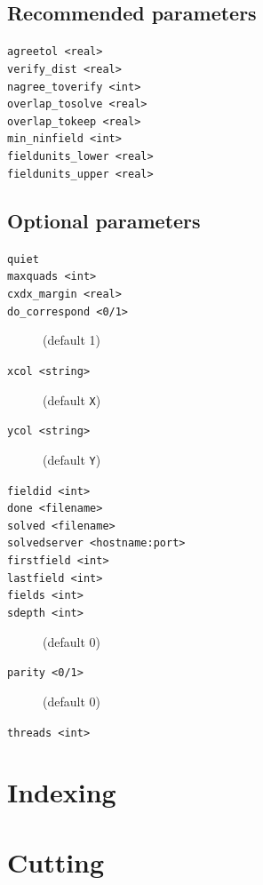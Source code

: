 \documentclass[12pt,letterpaper,titlepage]{article}
\newcommand{\code}[1]{\texttt{#1}}
\begin{document}
\subsection{Recommended parameters}
\begin{description}
\item[\code{agreetol <real>}]
\item[\code{verify\_dist <real>}]
\item[\code{nagree\_toverify <int>}]
\item[\code{overlap\_tosolve <real>}]
\item[\code{overlap\_tokeep <real>}]
\item[\code{min\_ninfield <int>}]
\item[\code{fieldunits\_lower <real>}]
\item[\code{fieldunits\_upper <real>}]
\end{description}

\subsection{Optional parameters}
\begin{description}
\item[\code{quiet}]
\item[\code{maxquads <int>}]
\item[\code{cxdx\_margin <real>}]
\item[\code{do\_correspond <0/1>}] (default 1)
\item[\code{xcol <string>}] (default \code{X})
\item[\code{ycol <string>}] (default \code{Y})
\item[\code{fieldid <int>}]
\item[\code{done <filename>}]
\item[\code{solved <filename>}]
\item[\code{solvedserver <hostname:port>}]
\item[\code{firstfield <int>}]
\item[\code{lastfield <int>}]
\item[\code{fields <int>}]
\item[\code{sdepth <int>}] (default 0)
\item[\code{parity <0/1>}] (default 0)
\item[\code{threads <int>}]
\end{description}

\section{Indexing}

\section{Cutting}
\end{document}
